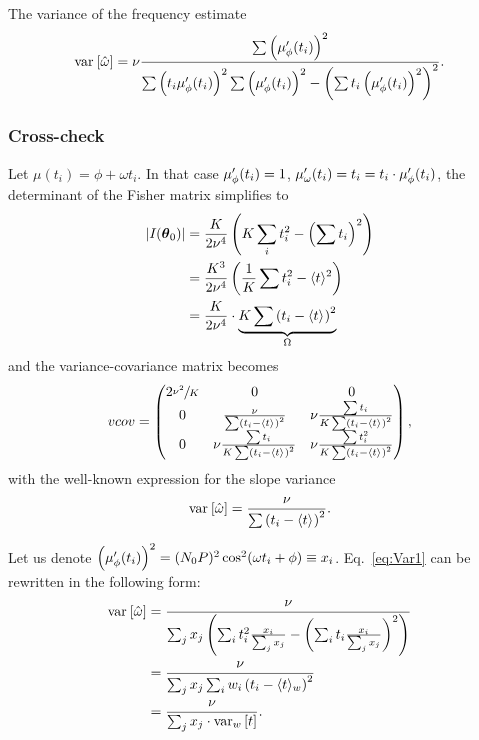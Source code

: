 The variance of the frequency estimate
\begin{equation}\label{eq:Var1}
  \var{\hat{\omega}} = \nu\frac{\sum\bkt{\mupp}^2}{\sum\bkt{t_i\mupp}^2\sum\bkt{\mupp}^2 - \bkt{\sum t_i\bkt{\mupp}^2}^2}.
\end{equation}


\subsubsection{Cross-check}
Let $\mu(t_i) = \phi + \omega t_i$. In that case $\mupp = 1$, $\mu'_\omega(t_i) = t_i = t_i\cdot\mupp$, the determinant of the Fisher matrix simplifies to 
\begin{align*}
  |\Fisher| &= \frac{K}{2\nu^4}\bkt{K\sum_i t_i^2 - \bkt{\sum t_i}^2} \\
  &= \frac{K^3}{2\nu^4}\bkt{\frac1K\sum t_i^2 - \avg{t}^2} \\
  &= \frac{K}{2\nu^4}\cdot\underbrace{K\sum\bkt{t_i - \avg{t}}^2}_{\STM}
\end{align*}
\newcommand{\SSX}{\sum\bkt{t_i - \avg{t}}^2}
and the variance-covariance matrix becomes
\[
vcov = \begin{pmatrix}
  2\sfrac{\nu^2}{K}& 0									& 0				\\
  0				&\frac{\nu}{\SSX}		&\nu\frac{\sum t_i}{K\SSX}\\
  0				&\nu\frac{\sum t_i}{K\SSX}	&\nu\frac{\sum t_i^2}{K\SSX}
\end{pmatrix},
\]
with the well-known expression for the slope variance
\[
\var{\hat\omega} = \frac{\nu}{\SSX}.
\]

Let us denote $\bkt{\mupp}^2 = (N_0P)^2\cos^2(\omega t_i + \phi) \equiv x_i$. Eq.~\eqref{eq:Var1} can be rewritten in the following form:
\begin{align}
  \var{\hat\omega} &= \frac{\nu}{\sum_j x_j \bkt{\sum_i t_i^2 \frac{x_i}{\sum_j x_j} - \bkt{\sum_i t_i \frac{x_i}{\sum_j x_j}}^2}} \notag\\
  &= \frac{\nu}{\sum_j x_j \sum_i w_i\bkt{t_i - \avg{t}[w]}^2} \notag\\
  &= \frac{\nu}{\sum_j x_j \cdot\var[w]{t}}. \label{eq:Var2}
\end{align}


